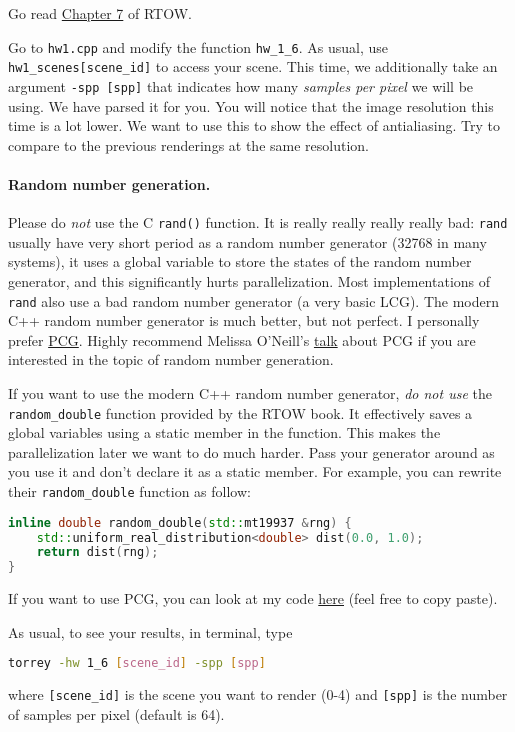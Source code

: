 Go read \href{https://raytracing.github.io/books/RayTracingInOneWeekend.html#antialiasing}{Chapter 7} of RTOW.

Go to \lstinline{hw1.cpp} and modify the function \lstinline{hw_1_6}. As usual, use \lstinline{hw1_scenes[scene_id]} to access your scene. This time, we additionally take an argument \lstinline{-spp [spp]} that indicates how many \emph{samples per pixel} we will be using. We have parsed it for you. You will notice that the image resolution this time is a lot lower. We want to use this to show the effect of antialiasing. Try to compare to the previous renderings at the same resolution.

\paragraph{Random number generation.} Please do \emph{not} use the C \lstinline{rand()} function. It is really really really really bad: \lstinline{rand} usually have very short period as a random number generator (32768 in many systems), it uses a global variable to store the states of the random number generator, and this significantly hurts parallelization. Most implementations of \lstinline{rand} also use a bad random number generator (a very basic LCG). The modern C++ random number generator is much better, but not perfect. I personally prefer \href{https://www.pcg-random.org/}{PCG}. Highly recommend Melissa O'Neill's \href{https://www.youtube.com/watch?v=45Oet5qjlms}{talk} about PCG if you are interested in the topic of random number generation.

If you want to use the modern C++ random number generator, \emph{do not use} the \lstinline{random_double} function provided by the RTOW book. It effectively saves a global variables using a static member in the function. This makes the parallelization later we want to do much harder. Pass your generator around as you use it and don't declare it as a static member. For example, you can rewrite their \lstinline{random_double} function as follow:
\begin{lstlisting}[language=C++]
inline double random_double(std::mt19937 &rng) {
    std::uniform_real_distribution<double> dist(0.0, 1.0);
    return dist(rng);
}
\end{lstlisting}
If you want to use PCG, you can look at my code \href{https://github.com/BachiLi/lajolla_public/src/pcg.h}{here} (feel free to copy paste).

As usual, to see your results, in terminal, type
\begin{lstlisting}[language=bash]
  torrey -hw 1_6 [scene_id] -spp [spp]
\end{lstlisting}
where \lstinline{[scene_id]} is the scene you want to render (0-4) and \lstinline{[spp]} is the number of samples per pixel (default is 64).

